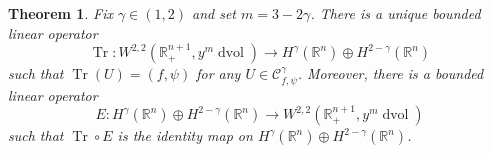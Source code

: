 \documentclass{amsart}
\newtheorem{thm}{Theorem}[section]
\theoremstyle{definition}
\theoremstyle{remark}
\numberwithin{equation}{section}
\begin{document}
\begin{thm}
 \label{thm:trace_rn}
 Fix $\gamma\in(1,2)$ and set $m=3-2\gamma$.  There is a unique bounded linear operator
 \begin{equation}
  \label{eqn:trace_mapping}
  \operatorname{Tr}\colon W^{2,2}({\mathbb{R}}_+^{n+1},y^m\operatorname{dvol}) \to H^\gamma({\mathbb{R}}^n) \oplus H^{2-\gamma}({\mathbb{R}}^n)
 \end{equation}
 such that $\operatorname{Tr}(U)=(f,\psi)$ for any $U\in{\mathcal{C}}_{f,\psi}^\gamma$.  Moreover, there is a bounded linear operator
 \begin{equation}
  \label{eqn:E_ext}
  E\colon H^\gamma({\mathbb{R}}^n) \oplus H^{2-\gamma}({\mathbb{R}}^n) \to W^{2,2}({\mathbb{R}}_+^{n+1},y^m\operatorname{dvol})
 \end{equation}
 such that $\operatorname{Tr}\circ E$ is the identity map on $H^\gamma({\mathbb{R}}^n)\oplus H^{2-\gamma}({\mathbb{R}}^n)$.
\end{thm}
\end{document}
